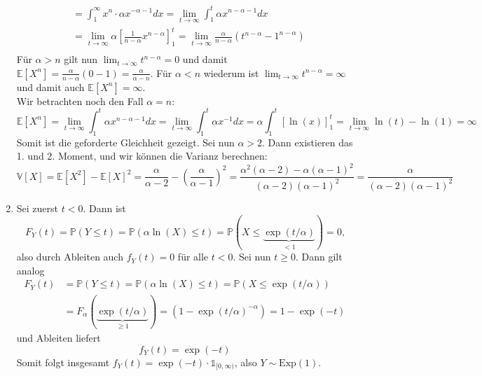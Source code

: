 \documentclass{article}
\def\to{\ensuremath{\rightarrow}} %
\begin{document}
\begin{enumerate}[label=(\alph*)]
\begin{align*}
		                      & = \int_{1}^{\infty} x^n \cdot \alpha x^{-\alpha - 1} dx = \lim_{t \to \infty} \int_{1}^{t} \alpha x^{n - \alpha - 1} dx                                                    \\
		                      & = \lim_{t \to \infty} \alpha \left[\frac{1}{n - \alpha} x^{n - \alpha}\right]_1^t = \lim_{t \to \infty} \frac{\alpha}{n - \alpha} \left(t^{n-\alpha} - 1^{n-\alpha}\right) \\
	      \end{align*}
	      Für $\alpha > n$ gilt nun $\lim_{t \to \infty} t^{n - \alpha} = 0$ und damit $\mathds{E}[X^n] = \frac{\alpha}{n - \alpha} (0 - 1) = \frac{\alpha}{\alpha - n}$. Für $\alpha < n$ wiederum ist $\lim_{t \to \infty} t^{n - \alpha} = \infty$ und damit auch $\mathds{E}[X^n] = \infty$. \\
	      Wir betrachten noch den Fall $\alpha = n$:
	      \begin{equation*}
		      \mathds{E}[X^n] = \lim_{t \to \infty} \int_{1}^{t} \alpha x^{n - \alpha - 1} dx = \lim_{t \to \infty} \int_{1}^t \alpha x^{-1} dx = \alpha \int_{1}^t \left[\ln(x)\right]_1^t = \lim_{t \to \infty} \ln(t)  - \ln(1) = \infty
	      \end{equation*}
	      Somit ist die geforderte Gleichheit gezeigt. Sei nun $\alpha > 2$. Dann existieren das 1. und 2. Moment, und wir können die Varianz berechnen:
	      \begin{equation*}
		      \mathds{V}[X] = \mathds{E}[X^2] - \mathds{E}[X]^2 = \frac{\alpha}{\alpha - 2} - \left(\frac{\alpha}{\alpha - 1}\right)^2 = \frac{\alpha^2(\alpha-2) - \alpha (\alpha-1)^2}{(\alpha - 2)(\alpha - 1)^2} = \frac{\alpha}{(\alpha - 2)(\alpha - 1)^2}
	      \end{equation*}
	\item Sei zuerst $t < 0$. Dann ist
	      \begin{equation*}
		      F_Y(t) = \mathds{P}(Y \leq t) = \mathds{P}(\alpha \ln(X) \leq t) = \mathds{P}(X \leq \underbrace{\exp(t/\alpha)}_{<1}) = 0\text{,}
	      \end{equation*}
	      also durch Ableiten auch $f_Y(t) = 0$ für alle $t<0$. Sei nun $t \geq 0$. Dann gilt analog
	      \begin{align*}
		      F_Y(t) & = \mathds{P}(Y \leq t) = \mathds{P}(\alpha \ln(X) \leq t) = \mathds{P}(X \leq \exp(t/\alpha))    \\
		             & = F_\alpha(\underbrace{\exp(t/\alpha)}_{\geq 1}) = (1 - \exp(t/\alpha)^{-\alpha}) = 1 - \exp(-t)
	      \end{align*}
	      und Ableiten liefert
	      \begin{equation*}
		      f_Y(t) = \exp(-t)
	      \end{equation*}
	      Somit folgt insgesamt $f_Y(t) = \exp(-t) \cdot \mathds{1}_{[0, \infty)}$, also $Y \sim \mathrm{Exp}(1)$.
\end{enumerate}
\end{document}

